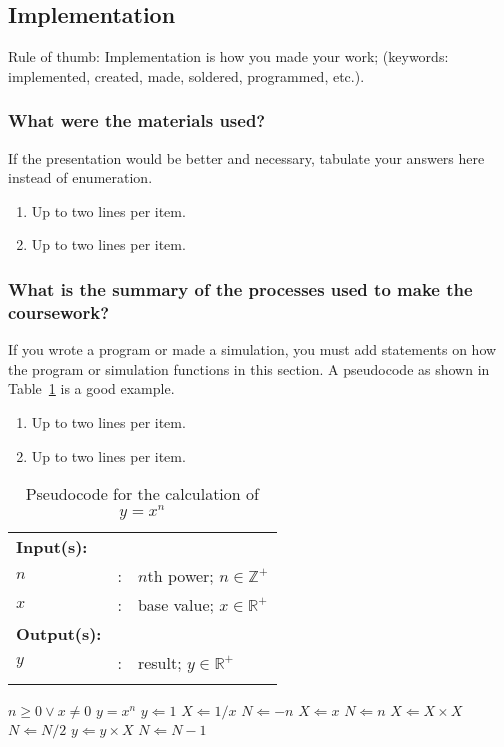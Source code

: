 \subsection{Implementation}
\label{sec:implem}

Rule of thumb: Implementation is how you made your work; (keywords: implemented, created, made, soldered, programmed, etc.).


\subsubsection{What were the materials used?}
If the presentation would be better and necessary, tabulate your answers here instead of enumeration.
\begin{enumerate}
\item Up to two lines per item.
\item Up to two lines per item.
\end{enumerate}


\subsubsection{What is the summary of the processes used to make the coursework?}
If you wrote a program or made a simulation, you must add statements on how the program or simulation functions in this section.	A pseudocode as shown in Table~\ref{tab:calcxn} is a good example.
\begin{enumerate}
\item Up to two lines per item.
\item Up to two lines per item.
\end{enumerate}

\begin{table}[!b]
	\caption{Pseudocode for the calculation of $y = x^n$}
	\label{tab:calcxn}	
	\centering
	{\footnotesize
	\begin{tabular}{lll}
	\hline
	\hline
	{\bfseries Input(s):} & & \\
	$n$ & : & $n$th power; $n \in \mathbb{Z}^{+}$ \\
	$x$ & : & base value; $x \in \mathbb{R}^{+}$ \\
	\hline
	{\bfseries Output(s):} & & \\
	$y$ & : & result; $y \in \mathbb{R}^{+}$  \\
	\hline
	\hline
	\\
	\end{tabular}
	}
	\begin{algorithmic}[1]
	{\footnotesize
		\REQUIRE $n \geq 0 \vee x \neq 0$
		\ENSURE $y = x^n$
		\STATE $y \Leftarrow 1$
				\STATE $X \Leftarrow 1 / x$
				\STATE $N \Leftarrow -n$
		\ELSE
				\STATE $X \Leftarrow x$
				\STATE $N \Leftarrow n$
		\ENDIF
						\STATE $X \Leftarrow X \times X$
						\STATE $N \Leftarrow N / 2$
				\ELSE[$N$ is odd]
						\STATE $y \Leftarrow y \times X$
						\STATE $N \Leftarrow N - 1$
				\ENDIF
		\ENDWHILE
	}
	\end{algorithmic}
\end{table}







